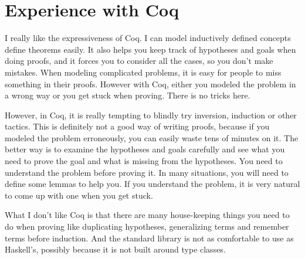 \documentclass{article}
\newcommand{\sco}[1]{\textsf{#1}}
\begin{document}




\section{Experience with Coq}

I really like the expressiveness of Coq. I can model inductively defined concepts define theorems easily. It
also helps you keep track of hypotheses and goals when doing proofs, and it forces you to consider
all the cases, so you don't make mistakes. When modeling complicated problems, it is easy for people to
miss something in their proofs. However with Coq, either you modeled the problem in a wrong way or
you get stuck when proving. There is no tricks here.

However, in Coq, it is really tempting to blindly try \sco{inversion}, \sco{induction} or other tactics.
This is definitely not a good way of writing proofs, because if you modeled the problem erroneously, you
can easily waste tens of minutes on it. The better way is to examine the hypotheses and goals carefully
and see what you need to prove the goal and what is missing from the hypotheses. You need to understand
the problem before proving it. In many situations, you will need to define some lemmas to help you.
If you understand the problem, it is very natural to come up with one when you get stuck.

What I don't like Coq is that there are many house-keeping things you need to do when proving like
duplicating hypotheses, generalizing terms and remember terms before induction. And the standard library
is not as comfortable to use as Haskell's, possibly because it is not built around type classes.

\printbibliography
\end{document}
